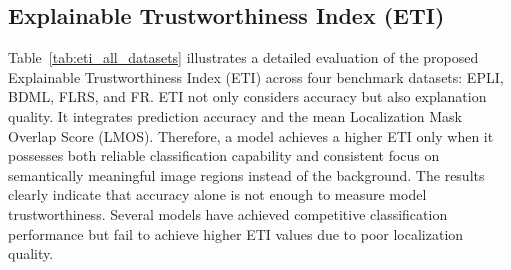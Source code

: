 \documentclass[a4paper,fleqn]{cas-dc}
\begin{document}
\subsection{Explainable Trustworthiness Index (ETI)}

Table~\ref{tab:eti_all_datasets} illustrates a detailed evaluation of the proposed Explainable Trustworthiness Index (ETI) across four benchmark datasets: EPLI, BDML, FLRS, and FR. ETI not only considers accuracy but also explanation quality. It integrates prediction accuracy and the mean Localization Mask Overlap Score (LMOS). Therefore, a model achieves a higher ETI only when it possesses both reliable classification capability and consistent focus on semantically meaningful image regions instead of the background. The results clearly indicate that accuracy alone is not enough to measure model trustworthiness. Several models have achieved competitive classification performance but fail to achieve higher ETI values due to poor localization quality.
\end{document}
